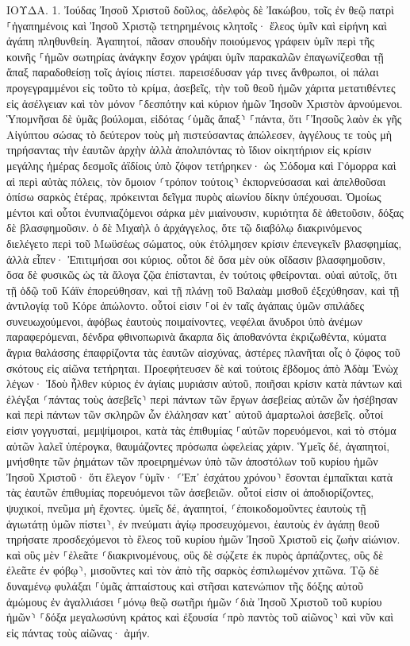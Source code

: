 \documentclass[twoside, 9pt]{extreport}
\begin{document}
ΙΟΥΔΑ.
1.
Ἰούδας Ἰησοῦ Χριστοῦ δοῦλος, ἀδελφὸς δὲ Ἰακώβου, τοῖς ἐν θεῷ πατρὶ ⸀ἠγαπημένοις καὶ Ἰησοῦ Χριστῷ τετηρημένοις κλητοῖς· 
ἔλεος ὑμῖν καὶ εἰρήνη καὶ ἀγάπη πληθυνθείη. 
Ἀγαπητοί, πᾶσαν σπουδὴν ποιούμενος γράφειν ὑμῖν περὶ τῆς κοινῆς ⸀ἡμῶν σωτηρίας ἀνάγκην ἔσχον γράψαι ὑμῖν παρακαλῶν ἐπαγωνίζεσθαι τῇ ἅπαξ παραδοθείσῃ τοῖς ἁγίοις πίστει. 
παρεισέδυσαν γάρ τινες ἄνθρωποι, οἱ πάλαι προγεγραμμένοι εἰς τοῦτο τὸ κρίμα, ἀσεβεῖς, τὴν τοῦ θεοῦ ἡμῶν χάριτα μετατιθέντες εἰς ἀσέλγειαν καὶ τὸν μόνον ⸀δεσπότην καὶ κύριον ἡμῶν Ἰησοῦν Χριστὸν ἀρνούμενοι. 
Ὑπομνῆσαι δὲ ὑμᾶς βούλομαι, εἰδότας ⸂ὑμᾶς ἅπαξ⸃ ⸀πάντα, ὅτι ⸀Ἰησοῦς λαὸν ἐκ γῆς Αἰγύπτου σώσας τὸ δεύτερον τοὺς μὴ πιστεύσαντας ἀπώλεσεν, 
ἀγγέλους τε τοὺς μὴ τηρήσαντας τὴν ἑαυτῶν ἀρχὴν ἀλλὰ ἀπολιπόντας τὸ ἴδιον οἰκητήριον εἰς κρίσιν μεγάλης ἡμέρας δεσμοῖς ἀϊδίοις ὑπὸ ζόφον τετήρηκεν· 
ὡς Σόδομα καὶ Γόμορρα καὶ αἱ περὶ αὐτὰς πόλεις, τὸν ὅμοιον ⸂τρόπον τούτοις⸃ ἐκπορνεύσασαι καὶ ἀπελθοῦσαι ὀπίσω σαρκὸς ἑτέρας, πρόκεινται δεῖγμα πυρὸς αἰωνίου δίκην ὑπέχουσαι. 
Ὁμοίως μέντοι καὶ οὗτοι ἐνυπνιαζόμενοι σάρκα μὲν μιαίνουσιν, κυριότητα δὲ ἀθετοῦσιν, δόξας δὲ βλασφημοῦσιν. 
ὁ δὲ Μιχαὴλ ὁ ἀρχάγγελος, ὅτε τῷ διαβόλῳ διακρινόμενος διελέγετο περὶ τοῦ Μωϋσέως σώματος, οὐκ ἐτόλμησεν κρίσιν ἐπενεγκεῖν βλασφημίας, ἀλλὰ εἶπεν· Ἐπιτιμήσαι σοι κύριος. 
οὗτοι δὲ ὅσα μὲν οὐκ οἴδασιν βλασφημοῦσιν, ὅσα δὲ φυσικῶς ὡς τὰ ἄλογα ζῷα ἐπίστανται, ἐν τούτοις φθείρονται. 
οὐαὶ αὐτοῖς, ὅτι τῇ ὁδῷ τοῦ Κάϊν ἐπορεύθησαν, καὶ τῇ πλάνῃ τοῦ Βαλαὰμ μισθοῦ ἐξεχύθησαν, καὶ τῇ ἀντιλογίᾳ τοῦ Κόρε ἀπώλοντο. 
οὗτοί εἰσιν ⸀οἱ ἐν ταῖς ἀγάπαις ὑμῶν σπιλάδες συνευωχούμενοι, ἀφόβως ἑαυτοὺς ποιμαίνοντες, νεφέλαι ἄνυδροι ὑπὸ ἀνέμων παραφερόμεναι, δένδρα φθινοπωρινὰ ἄκαρπα δὶς ἀποθανόντα ἐκριζωθέντα, 
κύματα ἄγρια θαλάσσης ἐπαφρίζοντα τὰς ἑαυτῶν αἰσχύνας, ἀστέρες πλανῆται οἷς ὁ ζόφος τοῦ σκότους εἰς αἰῶνα τετήρηται. 
Προεφήτευσεν δὲ καὶ τούτοις ἕβδομος ἀπὸ Ἀδὰμ Ἑνὼχ λέγων· Ἰδοὺ ἦλθεν κύριος ἐν ἁγίαις μυριάσιν αὐτοῦ, 
ποιῆσαι κρίσιν κατὰ πάντων καὶ ἐλέγξαι ⸂πάντας τοὺς ἀσεβεῖς⸃ περὶ πάντων τῶν ἔργων ἀσεβείας αὐτῶν ὧν ἠσέβησαν καὶ περὶ πάντων τῶν σκληρῶν ὧν ἐλάλησαν κατ᾽ αὐτοῦ ἁμαρτωλοὶ ἀσεβεῖς. 
οὗτοί εἰσιν γογγυσταί, μεμψίμοιροι, κατὰ τὰς ἐπιθυμίας ⸀αὐτῶν πορευόμενοι, καὶ τὸ στόμα αὐτῶν λαλεῖ ὑπέρογκα, θαυμάζοντες πρόσωπα ὠφελείας χάριν. 
Ὑμεῖς δέ, ἀγαπητοί, μνήσθητε τῶν ῥημάτων τῶν προειρημένων ὑπὸ τῶν ἀποστόλων τοῦ κυρίου ἡμῶν Ἰησοῦ Χριστοῦ· 
ὅτι ἔλεγον ⸀ὑμῖν· ⸂Ἐπ᾽ ἐσχάτου χρόνου⸃ ἔσονται ἐμπαῖκται κατὰ τὰς ἑαυτῶν ἐπιθυμίας πορευόμενοι τῶν ἀσεβειῶν. 
οὗτοί εἰσιν οἱ ἀποδιορίζοντες, ψυχικοί, πνεῦμα μὴ ἔχοντες. 
ὑμεῖς δέ, ἀγαπητοί, ⸂ἐποικοδομοῦντες ἑαυτοὺς τῇ ἁγιωτάτῃ ὑμῶν πίστει⸃, ἐν πνεύματι ἁγίῳ προσευχόμενοι, 
ἑαυτοὺς ἐν ἀγάπῃ θεοῦ τηρήσατε προσδεχόμενοι τὸ ἔλεος τοῦ κυρίου ἡμῶν Ἰησοῦ Χριστοῦ εἰς ζωὴν αἰώνιον. 
καὶ οὓς μὲν ⸀ἐλεᾶτε ⸂διακρινομένους, 
οὓς δὲ σῴζετε ἐκ πυρὸς ἁρπάζοντες, οὓς δὲ ἐλεᾶτε ἐν φόβῳ⸃, μισοῦντες καὶ τὸν ἀπὸ τῆς σαρκὸς ἐσπιλωμένον χιτῶνα. 
Τῷ δὲ δυναμένῳ φυλάξαι ⸀ὑμᾶς ἀπταίστους καὶ στῆσαι κατενώπιον τῆς δόξης αὐτοῦ ἀμώμους ἐν ἀγαλλιάσει 
⸀μόνῳ θεῷ σωτῆρι ἡμῶν ⸂διὰ Ἰησοῦ Χριστοῦ τοῦ κυρίου ἡμῶν⸃ ⸀δόξα μεγαλωσύνη κράτος καὶ ἐξουσία ⸂πρὸ παντὸς τοῦ αἰῶνος⸃ καὶ νῦν καὶ εἰς πάντας τοὺς αἰῶνας· ἀμήν. 
\end{document}
